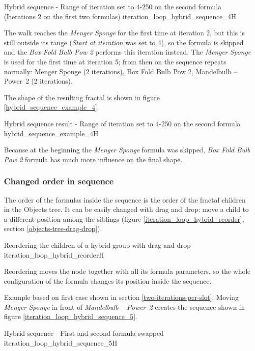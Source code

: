 {Hybrid sequence - Range of iteration set to 4-250 on the second formula (Iterations 2 on the first two formulas)}
{iteration_loop_hybrid_sequence_4}{H}

The walk reaches the \emph{Menger Sponge} for the first time at iteration 2, but this is still outside its range (\emph{Start at iteration} was set to 4), so the formula is skipped and the \emph{Box Fold Bulb Pow 2} performs this iteration instead. The \emph{Menger Sponge} is used for the first time at iteration 5; from then on the sequence repeats normally: Menger Sponge (2 iterations), Box Fold Bulb Pow 2, Mandelbulb -- Power~2 (2 iterations).

The shape of the resulting fractal is shown in figure \ref{hybrid_sequence_example_4}.

{Hybrid sequence result - Range of iteration set to 4-250 on the second formula}
{hybrid_sequence_example_4}{H}

Because at the beginning the \emph{Menger Sponge} formula was skipped, \emph{Box Fold Bulb Pow 2} formula has much more influence on the final shape.

\subsubsection{Changed order in sequence}

The order of the formulas inside the sequence is the order of the fractal children in the Objects tree. It can be easily changed with drag and drop: move a child to a different position among the siblings (figure \ref{iteration_loop_hybrid_reorder}, section \ref{objects-tree-drag-drop}).

{Reordering the children of a hybrid group with drag and drop}
{iteration_loop_hybrid_reorder}{H}

Reordering moves the node together with all its formula parameters, so the whole configuration of the formula changes its position inside the sequence.

Example based on first case shown in section \ref{two-iterations-per-slot}:
Moving \emph{Menger Sponge} in front of \emph{Mandelbulb -- Power~2} creates the sequence shown in figure \ref{iteration_loop_hybrid_sequence_5}.

{Hybrid sequence - First and second formula swapped}
{iteration_loop_hybrid_sequence_5}{H}

